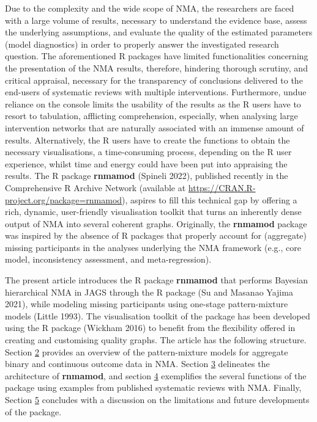 Due to the complexity and the wide scope of NMA, the researchers are faced with
a large volume of results, necessary to understand the evidence base, assess the
underlying assumptions, and evaluate the quality of the estimated parameters (model
diagnostics) in order to properly answer the investigated research question.
The aforementioned R packages have limited functionalities concerning
the presentation of the NMA results, therefore, hindering thorough scrutiny, and
critical appraisal, necessary for the transparency of conclusions delivered to the
end-users of systematic reviews with multiple interventions. Furthermore, undue
reliance on the console limits the usability of the results as the R users have
to resort to tabulation, afflicting comprehension, especially, when analysing
large intervention networks that are naturally associated with an immense amount
of results. Alternatively, the R users have to create the functions to obtain the
necessary visualisations, a time-consuming process, depending on the R user experience,
whilst time and energy could have been put into appraising the results. The R
package \textbf{rnmamod} (Spineli 2022), published recently in the Comprehensive R Archive
Network (available at
\url{https://CRAN.R-project.org/package=rnmamod}),
aspires to fill this technical gap by offering a rich, dynamic, user-friendly
visualisation toolkit that turns an inherently dense output of NMA into several
coherent graphs. Originally, the \textbf{rnmamod} package was inspired by the absence of
R packages that properly account for (aggregate) missing participants in the analyses
underlying the NMA framework (e.g., core model, inconsistency assessment, and
meta-regression).

The present article introduces the R package \textbf{rnmamod} that performs Bayesian
hierarchical NMA in JAGS through the R package  (Su and Masanao Yajima 2021),
while modeling missing participants using one-stage pattern-mixture models (Little 1993).
The visualisation toolkit of the package has been developed using the R package
 (Wickham 2016) to benefit from the flexibility offered in creating
and customising quality graphs. The article has the following structure. Section
\protect\hyperlink{Pattern-mixture-models-for-aggregate-binary-and-continuous-outcomes}{2} provides
an overview of the pattern-mixture models for aggregate binary and continuous
outcome data in NMA. Section \protect\hyperlink{The-architecture-of-ux2fpkgux5cux257Brnmamodux5cux257D}{3} delineates
the architecture of \textbf{rnmamod}, and section \protect\hyperlink{X}{4} exemplifies the several
functions of the package using examples from published systematic reviews with NMA.
Finally, Section \protect\hyperlink{X}{5} concludes with a discussion on the limitations and future
developments of the package.

